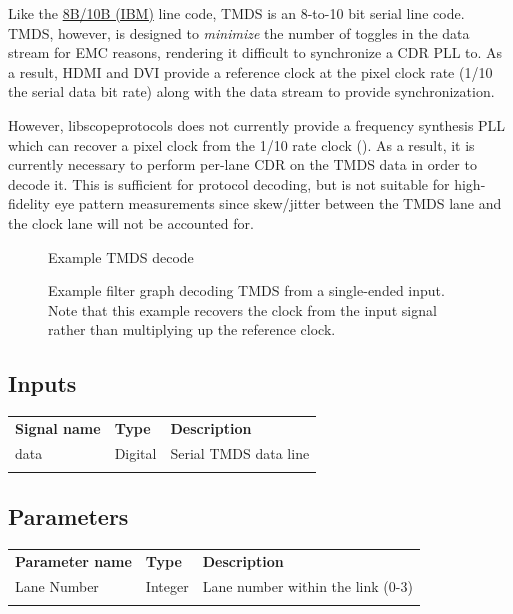 Like the \hyperref[filter:8b10b]{8B/10B (IBM)} line code, TMDS is an 8-to-10 bit serial line code. TMDS, however, is
designed to \emph{minimize} the number of toggles in the data stream for EMC reasons, rendering it difficult to
synchronize a CDR PLL to. As a result, HDMI and DVI provide a reference clock at the pixel clock rate (1/10 the serial
data bit rate) along with the data stream to provide synchronization.

However, libscopeprotocols does not currently provide a frequency synthesis PLL which can recover a pixel clock from
the 1/10 rate clock (). As a result, it is currently necessary to perform per-lane CDR on the TMDS
data in order to decode it. This is sufficient for protocol decoding, but is not suitable for high-fidelity eye pattern
measurements since skew/jitter between the TMDS lane and the clock lane will not be accounted for.

\begin{figure}[h]
\centering
{}
\caption{Example TMDS decode}
\label{filter_tmds}
\end{figure}

\begin{figure}[h]
\centering
{}
\caption{Example filter graph decoding TMDS from a single-ended input. Note that this example recovers the clock from
the input signal rather than multiplying up the reference clock.}
\label{filter_graph_tmds}
\end{figure}

\subsection{Inputs}

\begin{tabularx}{16cm}{llX}
\thickhline
\textbf{Signal name} & \textbf{Type} & \textbf{Description} \\
\thickhline
data & Digital & Serial TMDS data line \\
\thickhline
\end{tabularx}

\subsection{Parameters}

\begin{tabularx}{16cm}{llX}
\thickhline
\textbf{Parameter name} & \textbf{Type} & \textbf{Description} \\
\thinhline
Lane Number & Integer & Lane number within the link (0-3)\\
\thickhline
\end{tabularx}

